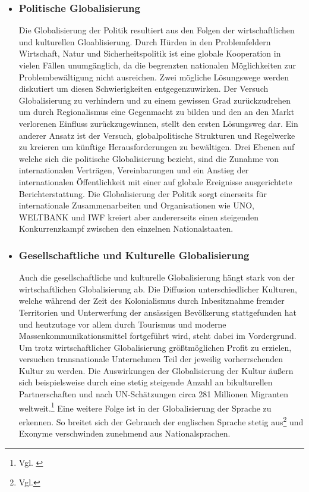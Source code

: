 \documentclass[12pt]{article}
\begin{document}
\begin{itemize}
    \item \subsubsection{Politische Globalisierung}
    \begin{sloppypar}
    Die Globalisierung der Politik resultiert aus den Folgen der wirtschaftlichen und kulturellen Gloablisierung. Durch Hürden in den Problemfeldern Wirtschaft, Natur und Sicherheitspolitik ist eine globale Kooperation in vielen Fällen unumgänglich, da die begrenzten nationalen Möglichkeiten zur Problembewältigung nicht ausreichen. Zwei mögliche Lösungswege werden diskutiert um diesen Schwierigkeiten entgegenzuwirken. Der Versuch Globalisierung zu verhindern und zu einem gewissen Grad zurückzudrehen um durch Regionalismus eine Gegenmacht zu bilden und den an den Markt verlorenen Einfluss zurückzugewinnen, stellt den ersten Lösungsweg dar. Ein anderer Ansatz ist der Versuch, globalpolitische Strukturen und Regelwerke zu kreieren um künftige Herausforderungen zu bewältigen. Drei Ebenen auf welche sich die politische Globalisierung bezieht, sind die Zunahme von internationalen Verträgen, Vereinbarungen und ein Anstieg der internationalen Öffentlichkeit mit einer auf globale Ereignisse ausgerichtete Berichterstattung. Die Globalisierung der Politik sorgt einerseits für internationale Zusammenarbeiten und Organisationen wie UNO, WELTBANK und IWF kreiert aber andererseits einen steigenden Konkurrenzkampf zwischen den einzelnen Nationalstaaten.
    \end{sloppypar}
    \item \subsubsection{Gesellschaftliche und Kulturelle Globalisierung}
    \begin{sloppypar}
    Auch die gesellschaftliche und kulturelle Globalisierung hängt stark von der wirtschaftlichen Globalisierung ab. Die Diffusion unterschiedlicher Kulturen, welche während der Zeit des Kolonialismus durch Inbesitznahme fremder Territorien und Unterwerfung der ansässigen Bevölkerung stattgefunden hat und heutzutage vor allem durch Tourismus und moderne Massenkommunikationsmittel fortgeführt wird, steht dabei im Vordergrund. Um trotz wirtschaftlicher Globalisierung größtmöglichen Profit zu erzielen, versuchen transnationale Unternehmen Teil der jeweilig vorherrschenden Kultur zu werden. Die Auswirkungen der Globalisierung der Kultur äußern sich beispielsweise durch eine stetig steigende Anzahl an bikulturellen Partnerschaften und nach UN-Schätzungen circa 281 Millionen Migranten weltweit.\footnote{Vgl. \cite{WMR2020}} Eine weitere Folge ist in der Globalisierung der Sprache zu erkennen. So breitet sich der Gebrauch der englischen Sprache stetig aus\footnote{Vgl.\cite{Sprache2016}} und Exonyme verschwinden zunehmend aus Nationalsprachen.

\end{sloppypar}
\end{itemize}
\end{document}
